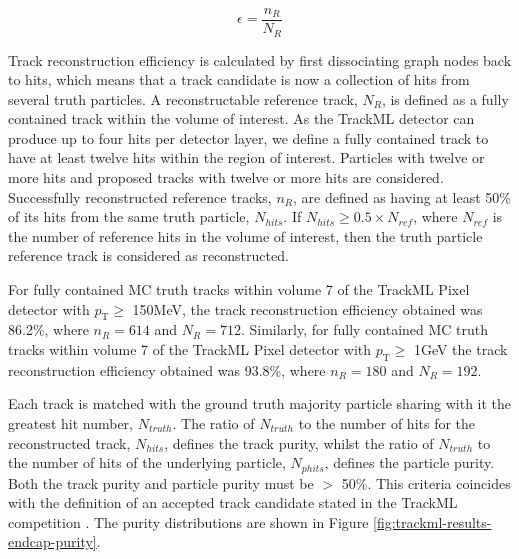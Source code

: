 \begin{equation}
    \epsilon = \frac{n_R}{N_R}
    \label{eqn:reoncstruction-eff}
\end{equation}

Track reconstruction efficiency is calculated by first dissociating graph nodes back to hits, which means that a track candidate is now a collection of hits from several truth particles. A reconstructable reference track, $N_R$, is defined as a fully contained track within the volume of interest. As the TrackML detector can produce up to four hits per detector layer, we define a fully contained track to have at least twelve hits within the region of interest. Particles with twelve or more hits and proposed tracks with twelve or more hits are considered. Successfully reconstructed reference tracks, $n_R$, are defined as having at least 50\% of its hits from the same truth particle, $N_{hits}$. If $N_{hits} \geq 0.5 \times N_{ref}$, where $N_{ref}$ is the number of reference hits in the volume of interest, then the truth particle reference track is considered as reconstructed.

For fully contained MC truth tracks within volume 7 of the TrackML Pixel detector with $p_{\text{T}} \geq$ 150MeV, the track reconstruction efficiency obtained was 86.2\%, where $n_R = 614$ and $N_R = 712$. Similarly, for fully contained MC truth tracks within volume 7 of the TrackML Pixel detector with $p_{\text{T}} \geq$ 1GeV the track reconstruction efficiency obtained was 93.8\%, where $n_R = 180$ and $N_R = 192$.



Each track is matched with the ground truth majority particle sharing with it the greatest hit number, $N_{truth}$. The ratio of $N_{truth}$ to the number of hits for the reconstructed track, $N_{hits}$, defines the track purity, whilst the ratio of $N_{truth}$ to the number of hits of the underlying particle, $N_{phits}$, defines the particle purity. Both the track purity and particle purity must be $>$ 50\%. This criteria coincides with the definition of an accepted track candidate stated in the TrackML competition \cite{kaggle-trackml}. The purity distributions are shown in Figure \ref{fig:trackml-results-endcap-purity}. 

